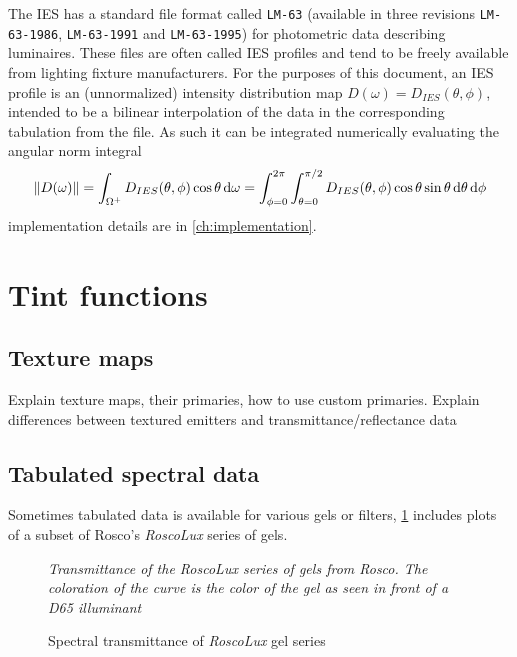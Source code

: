 The \gls{IES} has a standard file format called \texttt{LM-63} (available in
three revisions \texttt{LM-63-1986}, \texttt{LM-63-1991} and
\texttt{LM-63-1995}) for photometric data describing luminaires. These files
are often called \gls{IES} profiles and tend to be freely available from lighting fixture
manufacturers. For the purposes of this document, an \gls{IES} profile
is an (unnormalized) intensity distribution map $D(\omega) =
D_{IES}(\theta,\phi)$, intended to be a bilinear interpolation of the data in
the corresponding tabulation from the file. As such it can be integrated
numerically evaluating the angular norm integral
\begin{equation}
\|D(\omega)\|
   = \int_{\Omega^+}  D_{IES}(\theta,\phi) \cos\theta \d\omega
   = \int_{\phi = 0}^{2\pi} \int_{\theta = 0}^{\pi/2}
        D_{IES}(\theta,\phi) \cos\theta \sin\theta \d\theta \d\phi
\end{equation}
implementation details are in \cref{ch:implementation}.

\section{Tint functions}

\subsection{Texture maps}

\begin{inconstruction}
Explain texture maps, their primaries, how to use custom primaries.
Explain differences between textured emitters and transmittance/reflectance data
\end{inconstruction}

\subsection{Tabulated spectral data}
Sometimes tabulated data is available for various gels or filters, \cref{fig:roscolux}
includes plots of a subset of Rosco's \emph{RoscoLux} series of gels.

\begin{figure}
{
\centering
\noindent{}
\caption{Spectral transmittance of \emph{RoscoLux} gel series}
\label{fig:roscolux}
}
\vskip 1mm
{\footnotesize\it Transmittance of the \emph{RoscoLux} series of gels from
Rosco. The coloration of the curve is the color of the gel as seen in front
of a D65 illuminant}
\end{figure}


